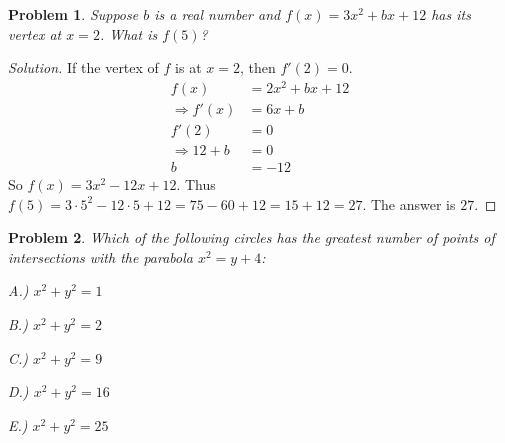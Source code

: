 \documentclass[crop=false,class=book]{standalone}
\theoremstyle{mystyle}
\newtheorem{problem}{Problem}[section]
\begin{document}
\begin{problem}
Suppose $b$ is a real number and $f(x) = 3x^2+bx+12$ has its vertex at $x=2$. What is $f(5)$?
\end{problem}
\begin{proof}[Solution]
If the vertex of $f$ is at $x=2$, then $f'(2) = 0$.
\begin{align*}
    f(x)&=2x^{2}+bx+12\\
    \Rightarrow f'(x)&=6x+b\\
    f'(2)&=0\\
    \Rightarrow 12 + b &= 0 \\
    b&=-12
\end{align*}
So $f(x) = 3x^2 -12 x + 12$. Thus $f(5) = 3\cdot 5^2 - 12\cdot 5 + 12 = 75 - 60 + 12 = 15 + 12 = 27$. The answer is $27$.
\end{proof}
\begin{problem}
Which of the following circles has the greatest number of points of intersections with the parabola $x^2 = y+4$:
\begin{enumerate}
\begin{multicols}{5}
    \item[A.)] $x^2+y^2 = 1$
    \item[B.)] $x^2+y^2 = 2$
    \item[C.)] $x^2+y^2 = 9$
    \item[D.)] $x^2+y^2 = 16$
    \item[E.)] $x^2+y^2=25$
\end{multicols}
\end{enumerate}
\end{problem}
\end{document}

